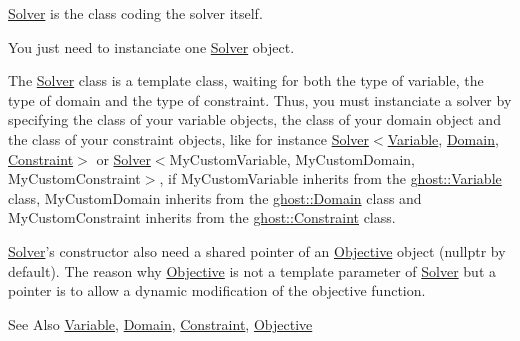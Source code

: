 \hyperlink{classghost_1_1Solver}{Solver} is the class coding the solver itself. 

You just need to instanciate one \hyperlink{classghost_1_1Solver}{Solver} object.

The \hyperlink{classghost_1_1Solver}{Solver} class is a template class, waiting for both the type of variable, the type of domain and the type of constraint. Thus, you must instanciate a solver by specifying the class of your variable objects, the class of your domain object and the class of your constraint objects, like for instance \hyperlink{classghost_1_1Solver}{Solver}$<$\hyperlink{classghost_1_1Variable}{Variable}, \hyperlink{classghost_1_1Domain}{Domain}, \hyperlink{classghost_1_1Constraint}{Constraint}$>$ or \hyperlink{classghost_1_1Solver}{Solver}$<$My\-Custom\-Variable, My\-Custom\-Domain, My\-Custom\-Constraint$>$, if My\-Custom\-Variable inherits from the \hyperlink{classghost_1_1Variable}{ghost\-::\-Variable} class, My\-Custom\-Domain inherits from the \hyperlink{classghost_1_1Domain}{ghost\-::\-Domain} class and My\-Custom\-Constraint inherits from the \hyperlink{classghost_1_1Constraint}{ghost\-::\-Constraint} class.

\hyperlink{classghost_1_1Solver}{Solver}'s constructor also need a shared pointer of an \hyperlink{classghost_1_1Objective}{Objective} object (nullptr by default). The reason why \hyperlink{classghost_1_1Objective}{Objective} is not a template parameter of \hyperlink{classghost_1_1Solver}{Solver} but a pointer is to allow a dynamic modification of the objective function.

\begin{DoxySeeAlso}{See Also}
\hyperlink{classghost_1_1Variable}{Variable}, \hyperlink{classghost_1_1Domain}{Domain}, \hyperlink{classghost_1_1Constraint}{Constraint}, \hyperlink{classghost_1_1Objective}{Objective} 
\end{DoxySeeAlso}


